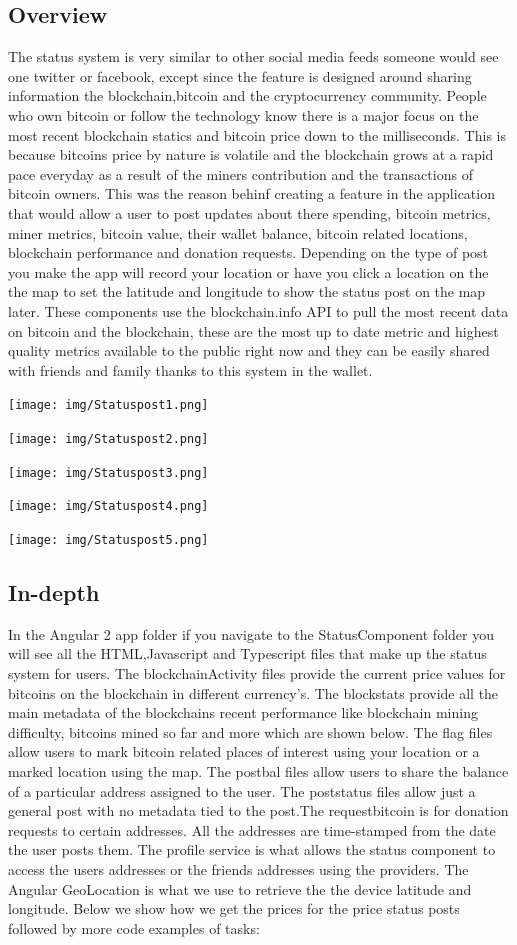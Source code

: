 \subsection{Overview}
The status system is very similar to other social media feeds someone would see one twitter or facebook, except since the feature is designed around sharing information the blockchain,bitcoin and the cryptocurrency community. People who own bitcoin or follow the technology know there is a major focus on the most recent blockchain statics and bitcoin price down to the milliseconds. This is because bitcoins price by nature is volatile and the blockchain grows at a rapid pace everyday as a result of the miners contribution and the transactions of bitcoin owners. This was the reason behinf creating a feature in the application that would allow a user to post updates about there spending, bitcoin metrics, miner metrics, bitcoin value, their wallet balance, bitcoin related locations, blockchain performance and donation requests. Depending on the type of post you make the app will record your location or have you click a location on the the map to set the latitude and longitude to show the status post on the map later. These components use the blockchain.info API to pull the most recent data on bitcoin and the blockchain, these are the most up to date metric and highest quality metrics available to the public right now and they can be easily shared with friends and family thanks to this system in the wallet.


\texttt{[image: img/Statuspost1.png]}

\texttt{[image: img/Statuspost2.png]}

\texttt{[image: img/Statuspost3.png]}

\texttt{[image: img/Statuspost4.png]}

\texttt{[image: img/Statuspost5.png]}

\subsection{In-depth}
In the Angular 2 app folder if you navigate to the StatusComponent folder you will see all the HTML,Javascript and Typescript files that make up the status system for users. The blockchainActivity files provide the current price values for bitcoins on the blockchain in different currency's. The blockstats provide all the main metadata of the blockchains recent performance like blockchain mining difficulty, bitcoins mined so far and more which are shown below. The flag files allow users to mark bitcoin related places of interest using your location or a marked location using the map. The postbal files allow users to share the balance of a particular address assigned to the user. The poststatus files allow just a general post with no metadata tied to the post.The requestbitcoin is for donation requests to certain addresses. All the addresses are time-stamped from the date the user posts them. The profile service is what allows the status component to access the users addresses or the friends addresses using the providers. The Angular GeoLocation is what we use to retrieve the the device latitude and longitude. Below we show how we get the prices for the price status posts followed by more code examples of tasks:


